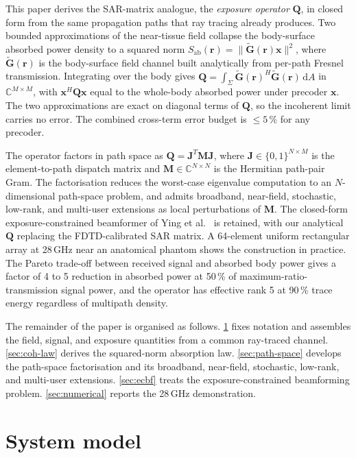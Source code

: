 \documentclass[journal,twocolumn,10pt]{IEEEtran}
\theoremstyle{plain}
\theoremstyle{remark}
\newcommand{\rr}{\mathbf{r}}
\newcommand{\xx}{\mathbf{x}}
\newcommand{\Sab}{S_{\mathrm{ab}}}
\newcommand{\Gtil}{\tilde{\mathbf{G}}}
\newcommand{\Qmat}{\mathbf{Q}}
\newcommand{\Mmat}{\mathbf{M}}
\newcommand{\Jmat}{\mathbf{J}}
\newcommand{\diff}{\mathrm{d}}
\newcommand{\Complex}{\mathbb{C}}
\begin{document}
This paper derives the SAR-matrix analogue, the \emph{exposure
operator} $\Qmat$, in closed form from the same propagation paths
that ray tracing already produces. Two bounded approximations of
the near-tissue field collapse the body-surface absorbed power
density to a squared norm $\Sab(\rr) = \|\Gtil(\rr)\xx\|^2$, where
$\Gtil(\rr)$ is the body-surface field channel built
analytically from per-path Fresnel transmission. Integrating over
the body gives
$\Qmat = \int_\Sigma \Gtil(\rr)^H \Gtil(\rr)\,\diff A$
in $\Complex^{M \times M}$, with $\xx^H \Qmat \xx$ equal to the
whole-body absorbed power under precoder $\xx$. The two
approximations are exact on diagonal terms of $\Qmat$, so the
incoherent limit carries no error. The combined cross-term error
budget is $\leq 5\,\%$ for any precoder.

The operator factors in path space as
$\Qmat = \Jmat^T \Mmat \Jmat$, where
$\Jmat \in \{0,1\}^{N \times M}$ is the element-to-path dispatch
matrix and $\Mmat \in \Complex^{N \times N}$ is the Hermitian
path-pair Gram. The factorisation reduces the worst-case eigenvalue
computation to an $N$-dimensional path-space problem, and admits
broadband, near-field, stochastic, low-rank, and multi-user
extensions as local perturbations of $\Mmat$. The closed-form
exposure-constrained beamformer of Ying et al.~\cite{Ying2015}
is retained, with our analytical $\Qmat$ replacing the
FDTD-calibrated SAR matrix. A 64-element uniform rectangular array
at 28\,GHz near an anatomical phantom shows the construction in
practice. The Pareto trade-off between received signal and absorbed
body power gives a factor of 4 to 5 reduction in absorbed power at
50\,\% of maximum-ratio-transmission signal power, and the operator
has effective rank 5 at 90\,\% trace energy regardless of multipath
density.

The remainder of the paper is organised as follows.
\cref{sec:setup} fixes notation and assembles the
field, signal, and exposure quantities from a common ray-traced
channel. \cref{sec:coh-law} derives the squared-norm
absorption law. \cref{sec:path-space}
develops the path-space factorisation and its broadband,
near-field, stochastic, low-rank, and multi-user extensions.
\cref{sec:ecbf} treats the exposure-constrained beamforming
problem. \cref{sec:numerical} reports the 28\,GHz demonstration.


\section{System model}\label{sec:setup}
\end{document}
